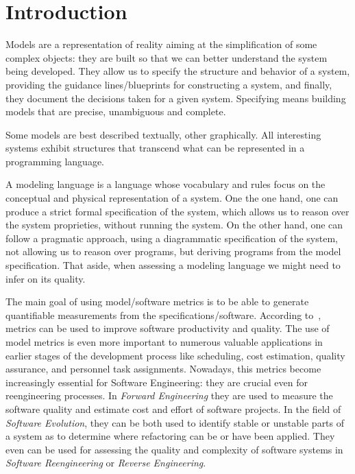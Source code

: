 \section{Introduction}

Models are a representation of reality aiming at the simplification of some complex objects: they are built so that we can better understand the system being developed.
They allow us to specify the structure and behavior of a system, providing the guidance lines/blueprints for constructing a system, and finally, they document the decisions taken for a given system.
Specifying means building models that are precise, unambiguous and complete. 

Some models are best described textually, other graphically. All interesting systems exhibit structures that transcend what can be represented in a programming language.

A modeling language is a language whose vocabulary and rules focus on the conceptual and physical representation of a system. %
One the one hand, one can produce a strict formal specification of the system, which allows us to reason over the system proprieties, without running the system.
On the other hand, one can follow a pragmatic approach, using a diagrammatic specification of the system, not allowing us to reason over programs,
but deriving programs from the model specification. That aside, when assessing a modeling language we might need to infer on its quality.

\begin{comment}
\begin{quotation}
Effective management of any process requires quantification, measurement, and modeling.
Software metrics provide a quantitative basis for the development and validation of models of the software development process.
Metrics can be used to improve software productivity and quality\cite{g1:Millis:1998}.
\end{quotation}
\end{comment}

The main goal of using model/software metrics is to be able to generate quantifiable measurements from the specifications/software. 
According to~\cite{g1:Millis:1998}, metrics can be used to improve software productivity and quality.
The use of model metrics is even more important to numerous valuable applications in earlier stages of the development process like scheduling, cost estimation, quality assurance, and personnel task assignments.
Nowadays, this metrics become increasingly essential for Software Engineering: they are crucial even for reengineering processes.
In \emph{Forward Engineering} they are used to measure the software quality and estimate cost and effort of software projects\cite{Fenton}.
In the field of \emph{Software Evolution}, they can be both used to identify stable or unstable parts of a system as to determine where refactoring can be or have been applied\cite{Serge}.
They even can be used for assessing the quality and complexity of software systems in \emph{Software Reengineering} or \emph{Reverse Engineering}\cite{43044}.

